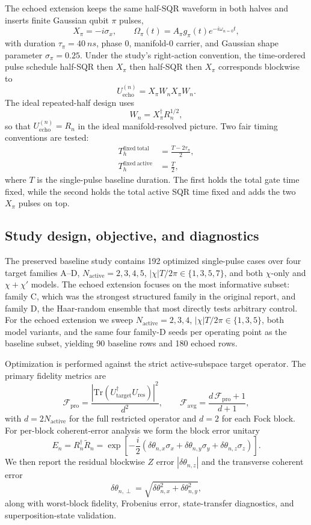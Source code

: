 \documentclass[aps,pra,twocolumn,reprint,floatfix,amsmath,amssymb]{revtex4-2}
\begin{document}
The echoed extension keeps the same half-SQR waveform in both halves and inserts finite Gaussian qubit \(\pi\) pulses,
\[
X_\pi = -i\sigma_x,
\qquad
\Omega_\pi(t) = A_\pi g_\pi(t)e^{-i\omega_{n=0}t},
\]
with duration \(\tau_\pi = \SI{40}{ns}\), phase \(0\), manifold-0 carrier, and Gaussian shape parameter \(\sigma_\pi = 0.25\). Under the study's right-action convention, the time-ordered pulse schedule half-SQR then \(X_\pi\) then half-SQR then \(X_\pi\) corresponds blockwise to
\[
U_{\mathrm{echo}}^{(n)} = X_\pi W_n X_\pi W_n.
\]
The ideal repeated-half design uses
\[
W_n = X_\pi^\dagger R_n^{1/2},
\]
so that \(U_{\mathrm{echo}}^{(n)} = R_n\) in the ideal manifold-resolved picture. Two fair timing conventions are tested:
\begin{align}
T_h^{\mathrm{fixed\ total}} &= \frac{T-2\tau_\pi}{2}, \\
T_h^{\mathrm{fixed\ active}} &= \frac{T}{2},
\end{align}
where \(T\) is the single-pulse baseline duration. The first holds the total gate time fixed, while the second holds the total active SQR time fixed and adds the two \(X_\pi\) pulses on top.

\subsection{Study design, objective, and diagnostics}
The preserved baseline study contains 192 optimized single-pulse cases over four target families A--D, \(N_{\mathrm{active}} = 2,3,4,5\), \(|\chi|T/2\pi\in\{1,3,5,7\}\), and both \(\chi\)-only and \(\chi+\chi'\) models. The echoed extension focuses on the most informative subset: family C, which was the strongest structured family in the original report, and family D, the Haar-random ensemble that most directly tests arbitrary control. For the echoed extension we sweep \(N_{\mathrm{active}}=2,3,4\), \(|\chi|T/2\pi\in\{1,3,5\}\), both model variants, and the same four family-D seeds per operating point as the baseline subset, yielding 90 baseline rows and 180 echoed rows.

Optimization is performed against the strict active-subspace target operator. The primary fidelity metrics are
\[
\mathcal{F}_{\mathrm{pro}} = \frac{\left|\mathrm{Tr}\left(U_{\mathrm{target}}^\dagger U_{\mathrm{res}}\right)\right|^2}{d^2},
\qquad
\mathcal{F}_{\mathrm{avg}} = \frac{d\,\mathcal{F}_{\mathrm{pro}} + 1}{d+1},
\]
with \(d=2N_{\mathrm{active}}\) for the full restricted operator and \(d=2\) for each Fock block. For per-block coherent-error analysis we form the block error unitary
\[
E_n = R_n^\dagger \widetilde{R}_n = \exp\!\left[-\frac{i}{2}(\delta\theta_{n,x}\sigma_x + \delta\theta_{n,y}\sigma_y + \delta\theta_{n,z}\sigma_z)\right].
\]
We then report the residual blockwise \(Z\) error \(|\delta\theta_{n,z}|\) and the transverse coherent error
\[
\delta\theta_{n,\perp} = \sqrt{\delta\theta_{n,x}^2 + \delta\theta_{n,y}^2},
\]
along with worst-block fidelity, Frobenius error, state-transfer diagnostics, and superposition-state validation.
\end{document}
